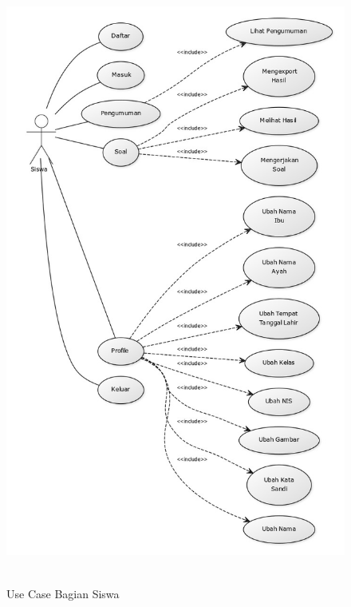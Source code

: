 \documentclass{scrreprt}
\begin{document}
		\begin{figure}
			\includegraphics[width=18cm, height=20cm]{usecase-siswa.jpg}
			\caption{Use Case Bagian Siswa}
		\end{figure}
	
\end{document}
